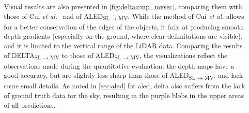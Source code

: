 Visual results are also presented in \cref{fig:delta:cmp_mvsec}, comparing them with those of Cui \textit{et al.}~\cite{Cui2022DenseDE} and of ALED\textsubscript{SL\(\rightarrow\)MV}. While the method of Cui \textit{et al.} allows for a better conservation of the edges of the objects, it fails at producing smooth depth gradients (especially on the ground, where clear delimitations are visible), and it is limited to the vertical range of the LiDAR data. Comparing the results of DELTA\textsubscript{SL\(\rightarrow\)MV} to those of ALED\textsubscript{SL\(\rightarrow\)MV}, the visualizations reflect the observations made during the quantitative evaluation: the depth maps have a good accuracy, but are slightly less sharp than those of ALED\textsubscript{SL\(\rightarrow\)MV}, and lack some small details. As noted in \cref{sec:aled} for \acrshort{aled}, \acrshort{delta} also suffers from the lack of ground truth data for the sky, resulting in the purple blobs in the upper areas of all predictions.

